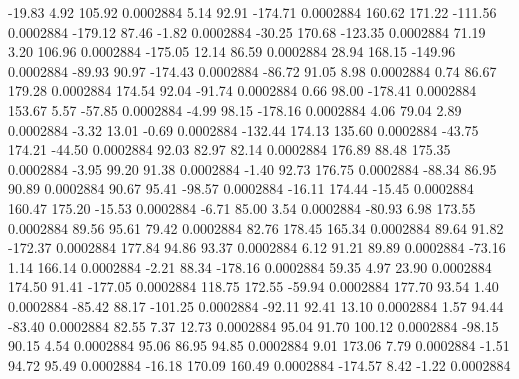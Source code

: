       -19.83        4.92      105.92     0.0002884
        5.14       92.91     -174.71     0.0002884
      160.62      171.22     -111.56     0.0002884
     -179.12       87.46       -1.82     0.0002884
      -30.25      170.68     -123.35     0.0002884
       71.19        3.20      106.96     0.0002884
     -175.05       12.14       86.59     0.0002884
       28.94      168.15     -149.96     0.0002884
      -89.93       90.97     -174.43     0.0002884
      -86.72       91.05        8.98     0.0002884
        0.74       86.67      179.28     0.0002884
      174.54       92.04      -91.74     0.0002884
        0.66       98.00     -178.41     0.0002884
      153.67        5.57      -57.85     0.0002884
       -4.99       98.15     -178.16     0.0002884
        4.06       79.04        2.89     0.0002884
       -3.32       13.01       -0.69     0.0002884
     -132.44      174.13      135.60     0.0002884
      -43.75      174.21      -44.50     0.0002884
       92.03       82.97       82.14     0.0002884
      176.89       88.48      175.35     0.0002884
       -3.95       99.20       91.38     0.0002884
       -1.40       92.73      176.75     0.0002884
      -88.34       86.95       90.89     0.0002884
       90.67       95.41      -98.57     0.0002884
      -16.11      174.44      -15.45     0.0002884
      160.47      175.20      -15.53     0.0002884
       -6.71       85.00        3.54     0.0002884
      -80.93        6.98      173.55     0.0002884
       89.56       95.61       79.42     0.0002884
       82.76      178.45      165.34     0.0002884
       89.64       91.82     -172.37     0.0002884
      177.84       94.86       93.37     0.0002884
        6.12       91.21       89.89     0.0002884
      -73.16        1.14      166.14     0.0002884
       -2.21       88.34     -178.16     0.0002884
       59.35        4.97       23.90     0.0002884
      174.50       91.41     -177.05     0.0002884
      118.75      172.55      -59.94     0.0002884
      177.70       93.54        1.40     0.0002884
      -85.42       88.17     -101.25     0.0002884
      -92.11       92.41       13.10     0.0002884
        1.57       94.44      -83.40     0.0002884
       82.55        7.37       12.73     0.0002884
       95.04       91.70      100.12     0.0002884
      -98.15       90.15        4.54     0.0002884
       95.06       86.95       94.85     0.0002884
        9.01      173.06        7.79     0.0002884
       -1.51       94.72       95.49     0.0002884
      -16.18      170.09      160.49     0.0002884
     -174.57        8.42       -1.22     0.0002884
